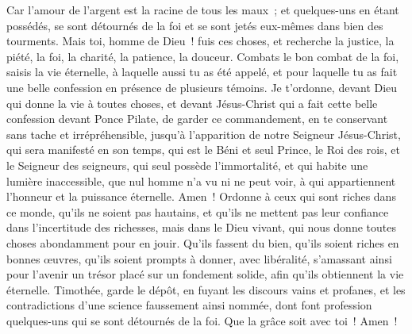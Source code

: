 \begin{multicols}{2}
Car l'amour de l'argent est la racine de tous les maux~; et quelques-uns en étant possédés, se sont détournés de la foi et se sont jetés eux-mêmes dans bien des tourments.
Mais toi, homme de Dieu~! fuis ces choses, et recherche la justice, la piété, la foi, la charité, la patience, la douceur.
Combats le bon combat de la foi, saisis la vie éternelle, à laquelle aussi tu as été appelé, et pour laquelle tu as fait une belle confession en présence de plusieurs témoins.
Je t'ordonne, devant Dieu qui donne la vie à toutes choses, et devant Jésus-Christ qui a fait cette belle confession devant Ponce Pilate,
de garder ce commandement, en te conservant sans tache et irrépréhensible, jusqu'à l'apparition de notre Seigneur Jésus-Christ,
qui sera manifesté en son temps, qui est le Béni et seul Prince, le Roi des rois, et le Seigneur des seigneurs,
qui seul possède l'immortalité, et qui habite une lumière inaccessible, que nul homme n'a vu ni ne peut voir, à qui appartiennent l'honneur et la puissance éternelle. Amen~!
Ordonne à ceux qui sont riches dans ce monde, qu'ils ne soient pas hautains, et qu'ils ne mettent pas leur confiance dans l'incertitude des richesses, mais dans le Dieu vivant, qui nous donne toutes choses abondamment pour en jouir.
Qu'ils fassent du bien, qu'ils soient riches en bonnes œuvres, qu'ils soient prompts à donner, avec libéralité,
s'amassant ainsi pour l'avenir un trésor placé sur un fondement solide, afin qu'ils obtiennent la vie éternelle.
Timothée, garde le dépôt, en fuyant les discours vains et profanes, et les contradictions d'une science faussement ainsi nommée,
dont font profession quelques-uns qui se sont détournés de la foi. Que la grâce soit avec toi~! Amen~!
\PPE{}
\end{multicols}
